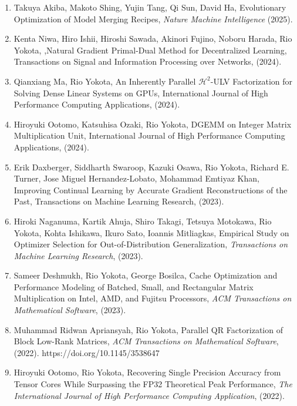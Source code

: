 \documentclass[margin,line]{cv}
\begin{document}
\begin{resume}
\begin{enumerate}
\item Takuya Akiba, Makoto Shing, Yujin Tang, Qi Sun, David Ha, Evolutionary Optimization of Model Merging Recipes, {\it Nature Machine Intelligence} (2025).

\item Kenta Niwa, Hiro Ishii, Hiroshi Sawada, Akinori Fujino, Noboru Harada, Rio Yokota, ,Natural Gradient Primal-Dual Method for Decentralized Learning, Transactions on Signal and Information Processing over Networks, (2024).

\item Qianxiang Ma, Rio Yokota, An Inherently Parallel $\mathcal{H}^2$-ULV Factorization for Solving Dense Linear Systems on GPUs, International Journal of High Performance Computing Applications, (2024).

\item Hiroyuki Ootomo, Katsuhisa Ozaki, Rio Yokota, DGEMM on Integer Matrix Multiplication Unit, International Journal of High Performance Computing Applications, (2024).

\item Erik Daxberger, Siddharth Swaroop, Kazuki Osawa, Rio Yokota, Richard E. Turner, Jose Miguel Hernandez-Lobato, Mohammad Emtiyaz Khan, Improving Continual Learning by Accurate Gradient Reconstructions of the Past, Transactions on Machine Learning Research, (2023).

\item Hiroki Naganuma, Kartik Ahuja, Shiro Takagi, Tetsuya Motokawa, Rio Yokota, Kohta Ishikawa, Ikuro Sato, Ioannis Mitliagkas, Empirical Study on Optimizer Selection for Out-of-Distribution Generalization, \textit{Transactions on Machine Learning Research}, (2023).

\item Sameer Deshmukh, Rio Yokota, George Bosilca, Cache Optimization and Performance Modeling of Batched, Small, and Rectangular Matrix Multiplication on Intel, AMD, and Fujitsu Processors, \textit{ACM Transactions on Mathematical Software}, (2023).

\item Muhammad Ridwan Apriansyah, Rio Yokota, Parallel QR Factorization of Block Low-Rank Matrices, \textit{ACM Transactions on Mathematical Software}, (2022). https://doi.org/10.1145/3538647

\item Hiroyuki Ootomo, Rio Yokota, Recovering Single Precision Accuracy from Tensor Cores While Surpassing the FP32 Theoretical Peak Performance, {\it The International Journal of High Performance Computing Application}, (2022).


\end{enumerate}
\end{resume}
\end{document}
